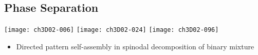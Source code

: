 \subsection*{Phase Separation}
\begin{frame}[t]
  \begin{center}
    \texttt{[image: ch3D02-006]}    
    \texttt{[image: ch3D02-024]}    
    \texttt{[image: ch3D02-096]}    
  \end{center}

  \begin{block}{}
    \begin{itemize}
    \item{%
      Directed pattern self-assembly in spinodal decomposition of binary
mixture
      }
      \end{itemize}
  \end{block}
\end{frame}


